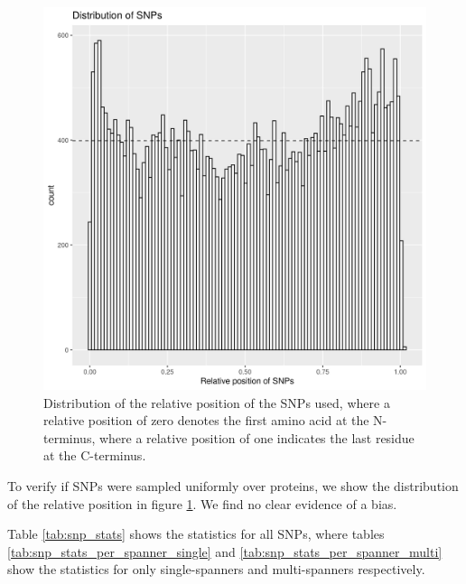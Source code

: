 \begin{figure}[!htbp]
  \includegraphics[width=\textwidth]{ncbi_peregrine_results/fig_snp_rel_pos.png}
  \caption{
    Distribution of the relative position of the SNPs used,
    where a relative position of zero denotes the first amino
    acid at the N-terminus, where a relative position of one
    indicates the last residue at the C-terminus.
  }
  \label{fig:snp_rel_pos}
\end{figure}


To verify if SNPs were sampled uniformly
over proteins, we show the distribution 
of the relative position in figure \ref{fig:snp_rel_pos}.
We find no clear evidence of a bias.


Table \ref{tab:snp_stats} shows the statistics for all
SNPs, where tables \ref{tab:snp_stats_per_spanner_single}
and \ref{tab:snp_stats_per_spanner_multi} show the
statistics for only single-spanners and multi-spanners respectively.
 
